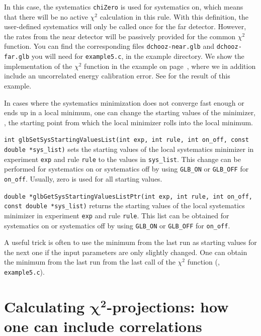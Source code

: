 In this case, the systematics {\tt chiZero} is used for systematics on, which means that there will
be no active $\chi^2$ calculation in this rule. With this definition, the user-defined systematics
will only be called once for the far detector. However, the rates from the near detector will be 
passively provided for the common $\chi^2$ function.
You can find the corresponding files {\tt dchooz-near.glb} and {\tt dchooz-far.glb} you will need for {\tt example5.c}, in the example directory. 
%
We show the implementation of the $\chi^2$ function in the example on page~\pageref{ex:syst},
where we in addition include an uncorrelated energy calibration error. See  for the result
of this example.
%

In cases where the systematics minimization does not converge fast enough or ends
up in a local minimum, one can change the starting values of the minimizer, \ie, the
starting point from which the local minimizer rolls into the local minimum.
\begin{function}
{\tt int glbSetSysStartingValuesList(int exp, int rule, int on\_off, const double *sys\_list)}
sets the starting values of the local systematics minimizer in experiment {\tt exp} and 
rule {\tt rule} to the values in {\tt sys\_list}. This change can be performed for
systematics on or systematics off by using {\tt GLB\_ON} or {\tt GLB\_OFF} for {\tt on\_off}. 
Usually, zero is used for all starting values. 
\end{function}
\begin{function}
{\tt double *glbGetSysStartingValuesListPtr(int exp, int rule, int on\_off, const double *sys\_list)}
returns the starting values of the local systematics minimizer in experiment {\tt exp} and 
rule {\tt rule}. This list can be obtained for
systematics on or systematics off by using {\tt GLB\_ON} or {\tt GLB\_OFF} for {\tt on\_off}.
\end{function}
A useful trick is often to use the minimum from the last run as starting values for the next one
if the input parameters are only slightly changed. One can obtain the minimum from the last run 
from the last call of the $\chi^2$ function (\cf, {\tt example5.c}).


\chapter[Calculating $\chi^2$-projections: how one can include correlations]{Calculating $\boldsymbol{\chi^2}$-projections: how one can include correlations}
\label{chapt:correlations}

